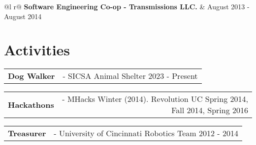 \documentclass[a4paper,12pt]{article}
\begin{document}
\begin{tabularx}{\linewidth}{@{}l r@{}}	
    \textbf{Software Engineering Co-op - Transmissions LLC. } & \hfill August 2013 - August 2014 \\[3.75pt]
\end{tabularx}

\section{Activities}
\begin{tabularx}{\linewidth}{@{}l r@{}}	
    \textbf{Dog Walker} & \hfill - SICSA Animal Shelter 2023 - Present \\[3.75pt]
\end{tabularx}

\begin{tabularx}{\linewidth}{@{}l r@{}}	
    \textbf{Hackathons} & \hfill - MHacks Winter (2014).  Revolution UC Spring 2014, Fall 2014, Spring 2016 \\[3.75pt]
\end{tabularx}

\begin{tabularx}{\linewidth}{@{}l r@{}}	
    \textbf{Treasurer} & \hfill - University of Cincinnati Robotics Team 2012 - 2014 \\[3.75pt]
\end{tabularx}

\end{document}
